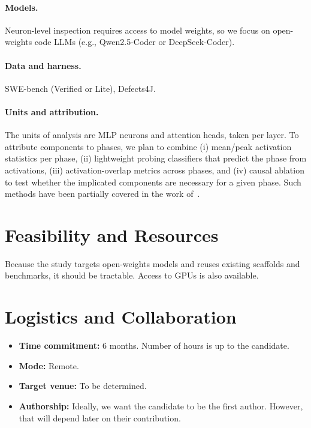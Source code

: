 \documentclass{article}
\begin{document}
\paragraph{Models.} Neuron-level inspection requires access to model weights, so we focus on open-weights code LLMs (e.g., Qwen2.5-Coder or DeepSeek-Coder).

\paragraph{Data and harness.} SWE-bench (Verified or Lite), Defects4J.

\paragraph{Units and attribution.} The units of analysis are MLP neurons and attention heads, taken per layer. To attribute components to phases, we plan to combine (i) mean/peak activation statistics per phase, (ii) lightweight probing classifiers that predict the phase from activations, (iii) activation-overlap metrics across phases, and (iv) causal ablation to test whether the implicated components are necessary for a given phase. Such methods have been partially covered in the work of~\cite{Sandovalsegura2026identifying}.

\section{Feasibility and Resources}
Because the study targets open-weights models and reuses existing scaffolds and benchmarks, it should be tractable. Access to GPUs is also available.

\section{Logistics and Collaboration}
\begin{itemize}
    \item \textbf{Time commitment:} $6$ months. Number of hours is up to the candidate.
    \item \textbf{Mode:} Remote.
    \item \textbf{Target venue:} To be determined.
    \item \textbf{Authorship:} Ideally, we want the candidate to be the first author. However, that will depend later on their contribution.
\end{itemize}
\end{document}
